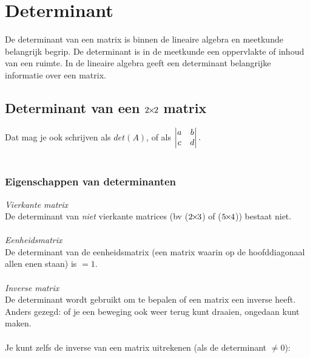 \chapter{Determinant}
\label{chap: Determinant}
De determinant van een matrix is binnen de lineaire algebra en meetkunde belangrijk begrip. De determinant is in de meetkunde een oppervlakte of inhoud van een ruimte. In de lineaire algebra geeft een determinant belangrijke informatie over een matrix.
\section{Determinant van een $2{\mkern-2mu\times\mkern-2mu}2$ matrix}

Dat mag je ook schrijven als \quad $det(A)$, \quad of als \quad $  \begin{vmatrix} a & b \\ c & d \end{vmatrix}.  $ \\ \\

\subsection{Eigenschappen van determinanten}
\textit{Vierkante matrix}\\
De determinant van \textit{niet} vierkante matrices (bv ($2{\mkern-2mu\times\mkern-2mu}3$) of ($5{\mkern-2mu\times\mkern-2mu}4$)) bestaat niet. \\ \\       
\textit{Eenheidsmatrix}\\
De determinant van de eenheidsmatrix (een matrix waarin op de hoofddiagonaal allen enen staan) is $= 1$. \\ \\
\textit{Inverse matrix}\\
De determinant wordt gebruikt om te bepalen of een matrix een inverse heeft. Anders gezegd: of je een beweging ook weer terug kunt draaien, ongedaan kunt maken. \\ \\
Je kunt zelfs de inverse van een matrix uitrekenen (als de determinant $\ne 0 $):\\

